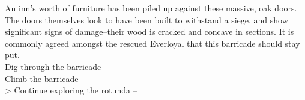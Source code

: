An inn’s worth of furniture has been piled up against these massive, oak doors. The doors themselves look to have been built to withstand a siege, and show significant signs of damage--their wood is cracked and concave in sections. It is commonly agreed amongst the rescued Everloyal that this barricade should stay put.\\

 Dig through the barricade -- \\
 Climb the barricade -- \\
> Continue exploring the rotunda -- 